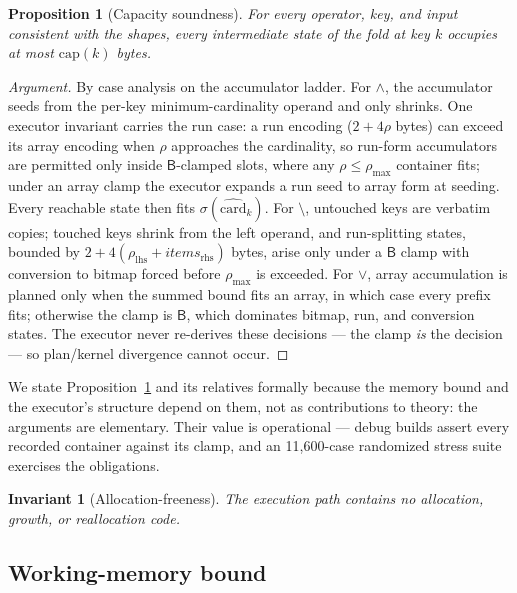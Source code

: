 \documentclass[sigconf,nonacm]{acmart}
\newcommand{\B}{\ensuremath{\mathsf{B}}}
\newcommand{\capm}{\ensuremath{\mathrm{cap}}}
\newtheorem{propx}{Proposition}
\newtheorem{invx}{Invariant}
\begin{document}
\begin{propx}[Capacity soundness]
\label{prop:clamp}
For every operator, key, and input consistent with the shapes, every
intermediate state of the fold at key $k$ occupies at most $\capm(k)$
bytes.
\end{propx}

\begin{proof}[Argument]
By case analysis on the accumulator ladder. For $\wedge$, the
accumulator seeds from the per-key minimum-cardinality operand and only
shrinks. One executor invariant carries the run case: a run encoding
($2{+}4\rho$ bytes) can exceed its array encoding when $\rho$
approaches the cardinality, so run-form accumulators are permitted only
inside $\B$-clamped slots, where any $\rho \le \rho_{\max}$ container
fits; under an array clamp the executor expands a run seed to array
form at seeding. Every reachable state then fits
$\sigma(\widehat{\mathrm{card}}_k)$. For $\setminus$, untouched keys are
verbatim copies; touched keys shrink from the left operand, and
run-splitting states, bounded by
$2 + 4(\rho_{\mathrm{lhs}} + \textit{items}_{\mathrm{rhs}})$ bytes,
arise only under a $\B$ clamp with conversion to bitmap forced before
$\rho_{\max}$ is exceeded. For $\vee$, array accumulation is planned
only when the summed bound fits an array, in which case every prefix
fits; otherwise the clamp is $\B$, which dominates bitmap, run, and
conversion states. The executor never re-derives these decisions ---
the clamp \emph{is} the decision --- so plan/kernel divergence cannot
occur.
\end{proof}

We state Proposition~\ref{prop:clamp} and its relatives formally because
the memory bound and the executor's structure depend on them, not as
contributions to theory: the arguments are elementary. Their value is
operational --- debug builds assert every recorded container against
its clamp, and an 11{,}600-case randomized stress suite exercises the
obligations.

\begin{invx}[Allocation-freeness]
\label{inv:alloc}
The execution path contains no allocation, growth, or reallocation
code.
\end{invx}

\subsection{Working-memory bound}
\label{sec:arenabound}
\end{document}
